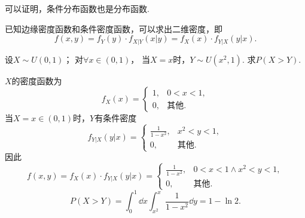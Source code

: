 可以证明，条件分布函数也是分布函数.

\begin{corollary}
已知边缘密度函数和条件密度函数，可以求出二维密度，即\[
	f(x,y) = f_Y(y) \cdot f_{X \vert Y}(x \vert y)
	= f_X(x) \cdot f_{Y \vert X}(y \vert x).
\]
\end{corollary}

\begin{example}
设\(X \sim U(0,1)\)；
对\(\forall x\in(0,1)\)，
当\(X=x\)时，\(Y \sim U(x^2,1)\).
求\(P(X > Y)\).
\begin{solution}
\(X\)的密度函数为\[
	f_X(x) = \left\{ \begin{array}{cl}
		1, & 0<x<1, \\
		0, & \text{其他}.
	\end{array} \right.
\]当\(X=x\in(0,1)\)时，\(Y\)有条件密度\[
	f_{Y \vert X}(y \vert x)
	= \left\{ \begin{array}{cl}
		\frac{1}{1-x^2}, & x^2<y<1, \\
		0, & \text{其他}.
	\end{array} \right.
\]因此\[
	f(x,y) = f_X(x) \cdot f_{Y \vert X}(y \vert x)
	= \left\{ \begin{array}{cl}
		\frac{1}{1-x^2}, & 0<x<1 \land x^2<y<1, \\
		0, & \text{其他}.
	\end{array} \right.
\]\[
	P(X > Y)
	= \int_0^1 \dd{x} \int_{x^2}^x \frac{1}{1-x^2} \dd{y}
	= 1 - \ln2.
\]
\end{solution}
\end{example}

